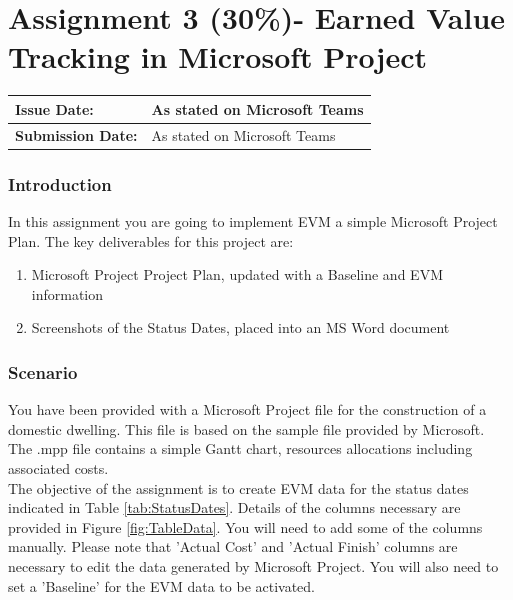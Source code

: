 


\part*{Assignment 3 (30\%)- Earned Value Tracking in Microsoft Project}



\begin{tabularx}{\textwidth}{ |X|X| }
	\hline
	\textbf{Issue Date:} & As stated on Microsoft Teams \\
	\hline 
	\textbf{Submission Date:}  & As stated on Microsoft Teams  \\
	\hline
\end{tabularx}

\section*{Introduction}

In this assignment you are going to implement EVM a simple Microsoft Project Plan.  The key deliverables for this project are:

\begin{enumerate}
	\item Microsoft Project Project Plan, updated with a Baseline and EVM information
	\item Screenshots of the Status Dates, placed into an MS Word document
\end{enumerate}




\section*{Scenario}

You have been provided with a Microsoft Project file for the construction of a domestic dwelling.  This file is based on the sample file provided by Microsoft.  The .mpp file contains a simple Gantt chart, resources allocations including associated costs. \\

The objective of the assignment is to create EVM data for the status dates indicated in Table \ref{tab:StatusDates}.  Details of the columns necessary are provided in Figure \ref{fig:TableData}.  You will need to add some of the columns manually.  Please note that 'Actual Cost' and 'Actual Finish' columns are necessary to edit the data generated by Microsoft Project.  You will also need to set a 'Baseline' for the EVM data to be activated.\\

